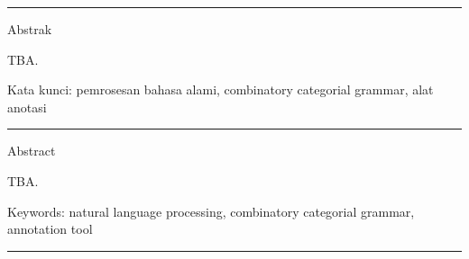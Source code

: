 {\bf \parindent0pt \noindent\rule{\textwidth}{1pt}
Abstrak

TBA.






\bigskip
Kata kunci: pemrosesan bahasa alami, combinatory categorial grammar, alat anotasi






\noindent\rule{\textwidth}{1pt}
Abstract

TBA.

\bigskip
Keywords: natural language processing, combinatory categorial grammar, annotation tool

\noindent\rule{\textwidth}{1pt} }
   



